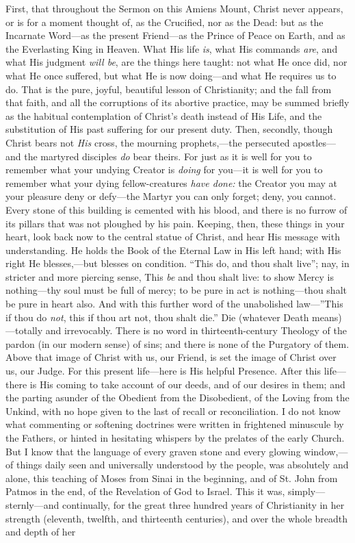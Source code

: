 \begin{quotex}
First, that throughout the Sermon on this Amiens Mount, Christ never appears, or is for a moment thought of, as the Crucified, nor as the Dead: but as the Incarnate Word---as the present Friend---as the Prince of Peace on Earth, and as the Everlasting King in Heaven. What His life \emph{is}, what His commands \emph{are}, and what His judgment \emph{will be}, are the things here taught: not what He once did, nor what He once suffered, but what He is now doing---and what He requires us to do. That is the pure, joyful, beautiful lesson of Christianity; and the fall from that faith, and all the corruptions of its abortive practice, may be summed briefly as the habitual contemplation of Christ's death instead of His Life, and the substitution of His past suffering for our present duty. \textbf{} Then, secondly, though Christ bears not \emph{His} cross, the mourning prophets,---the persecuted apostles---and the martyred disciples \emph{do} bear theirs. For just as it is well for you to remember what your undying Creator is \emph{doing} for you---it is well for you to remember what your dying fellow-creatures \emph{have done:} the Creator you may at your pleasure deny or defy---the Martyr you can only forget; deny, you cannot. Every stone of this building is cemented with his blood, and there is no furrow of its pillars that was not ploughed by his pain. \textbf{} Keeping, then, these things in your heart, look back now to the central statue of Christ, and hear His message with understanding. He holds the Book of the Eternal Law in His left hand; with His right He blesses,---but blesses on condition. ``This do, and thou shalt live''; nay, in stricter and more piercing sense, This \emph{be} and thou shalt live: to show Mercy is nothing---thy soul must be full of mercy; to be pure in act is nothing---thou shalt be pure in heart also. And with this further word of the unabolished law---''This if thou do \emph{not}, this if thou art not, thou shalt die.'' \textbf{} Die (whatever Death means)---totally and irrevocably. There is no word in thirteenth-century Theology of the pardon (in our modern sense) of sins; and there is none of the Purgatory of them. Above that image of Christ with us, our Friend, is set the image of Christ over us, our Judge. For this present life---here is His helpful Presence. After this life---there is His coming to take account of our deeds, and of our desires in them; and the parting asunder of the Obedient from the Disobedient, of the Loving from the Unkind, with no hope given to the last of recall or reconciliation. I do not know what commenting or softening doctrines were written in frightened minuscule by the Fathers, or hinted in hesitating whispers by the prelates of the early Church. But I know that the language of every graven stone and every glowing window,---of things daily seen and universally understood by the people, was absolutely and alone, this teaching of Moses from Sinai in the beginning, and of St. John from Patmos in the end, of the Revelation of God to Israel. This it was, simply---sternly---and continually, for the great three hundred years of Christianity in her strength (eleventh, twelfth, and thirteenth centuries), and over the whole breadth and depth of her 
\end{quotex}
